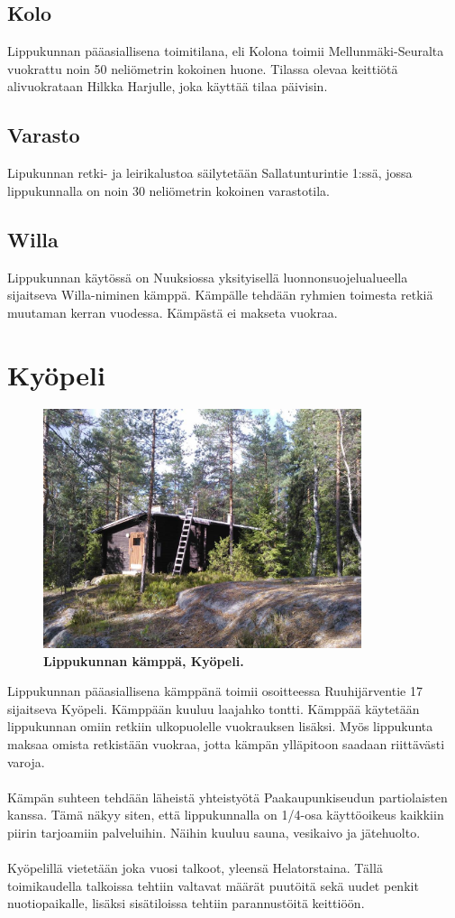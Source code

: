 \documentclass[a4paper, 12pt, finnish]{report} %
\begin{document}
\subsection{Kolo}
Lippukunnan pääasiallisena toimitilana, eli Kolona toimii Mellunmäki-Seuralta vuokrattu noin 50 neliömetrin kokoinen huone. Tilassa olevaa keittiötä alivuokrataan Hilkka Harjulle, joka käyttää tilaa päivisin.
\subsection{Varasto}
Lipukunnan retki- ja leirikalustoa säilytetään Sallatunturintie 1:ssä, jossa lippukunnalla on noin 30 neliömetrin kokoinen varastotila. 
\subsection{Willa}
Lippukunnan käytössä on Nuuksiossa yksityisellä luonnonsuojelualueella sijaitseva Willa-niminen kämppä. Kämpälle tehdään ryhmien toimesta retkiä muutaman kerran vuodessa. Kämpästä ei makseta vuokraa.
\newpage
\section{Kyöpeli}
\begin{figure}[htb]
	\begin{center}
		\includegraphics[height=7cm]{kyopeli.jpg}
	\end{center}
	\captionsetup{labelformat=empty}
	\caption{\textbf{Lippukunnan kämppä, Kyöpeli.}}
\end{figure}

Lippukunnan pääasiallisena kämppänä toimii osoitteessa Ruuhijärventie 17 sijaitseva Kyöpeli. Kämppään kuuluu laajahko tontti. Kämppää käytetään lippukunnan omiin retkiin ulkopuolelle vuokrauksen lisäksi. Myös lippukunta maksaa omista retkistään vuokraa, jotta kämpän ylläpitoon saadaan riittävästi varoja.\\
\\Kämpän suhteen tehdään läheistä yhteistyötä Paakaupunkiseudun partiolaisten kanssa. Tämä näkyy siten, että lippukunnalla on 1/4-osa käyttöoikeus kaikkiin piirin tarjoamiin palveluihin. Näihin kuuluu sauna, vesikaivo ja jätehuolto.\\
\\Kyöpelillä vietetään joka vuosi talkoot, yleensä Helatorstaina. Tällä toimikaudella talkoissa tehtiin valtavat määrät puutöitä sekä uudet penkit nuotiopaikalle, lisäksi sisätiloissa tehtiin parannustöitä keittiöön.
\newpage
\end{document}
